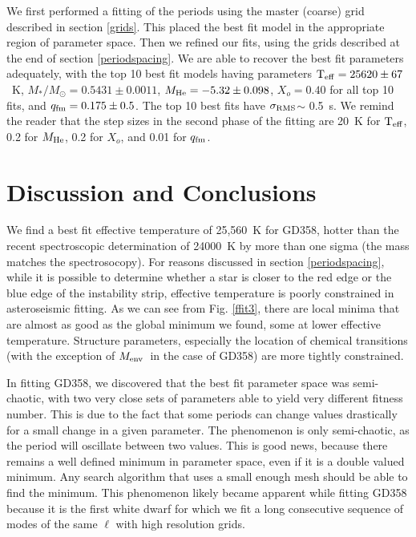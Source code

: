 \documentclass[12pt,preprint]{aastex}
\newcommand{\sigrms}{$\sigma_{\rm RMS}$}
\newcommand{\menv}{$M_{\rm env}$}
\begin{document}
We first performed a fitting of the periods using the master (coarse) grid described in section \ref{grids}. This placed the best fit model in the appropriate region of parameter space. Then we refined our fits, using the grids described at the end of section \ref{periodspacing}. We are able to recover the best fit parameters adequately, with the top 10 best fit models having parameters ${\rm T_{eff}}=25620 \pm 67$~K, $M_*/M_\odot=0.5431 \pm 0.0011$, $M_{\rm He}=-5.32 \pm 0.098$, $X_o=0.40$ for all top 10 fits, and $q_{\rm fm}=0.175 \pm 0.5$. The top 10 best fits have \sigrms $\sim$ 0.5~s. We remind the reader that the step sizes in the second phase of the fitting are 20~K for ${\rm T_{eff}}$, 0.2 for $M_{\rm He}$, 0.2 for $X_o$, and 0.01 for $q_{\rm fm}$.

\section{Discussion and Conclusions}
\label{discussion}

We find a best fit effective temperature of 25,560~K for GD358, hotter than the recent spectroscopic determination of 24000~K \citep{Koester2013} by more than one sigma (the mass matches the spectrosocopy). For reasons discussed in section \ref{periodspacing}, while it is possible to determine whether a star is closer to the red edge or the blue edge of the instability strip, effective temperature is poorly constrained in asteroseismic fitting. As we can see from Fig. \ref{ffit3}, there are local minima that are almost as good as the global minimum we found, some at lower effective temperature. Structure parameters, especially the location of chemical transitions (with the exception of \menv\ in the case of GD358) are more tightly constrained.

In fitting GD358, we discovered that the best fit parameter space was semi-chaotic, with two very close sets of parameters able to yield very different fitness number. This is due to the fact that some periods can change values drastically for a small change in a given parameter. The phenomenon is only semi-chaotic, as the period will oscillate between two values. This is good news, because there remains a well defined minimum in parameter space, even if it is a double valued minimum. Any search algorithm that uses a small enough mesh should be able to find the minimum. This phenomenon likely became apparent while fitting GD358 because it is the first white dwarf for which we fit a long consecutive sequence of modes of the same $\ell$ with high resolution grids.
\end{document}
